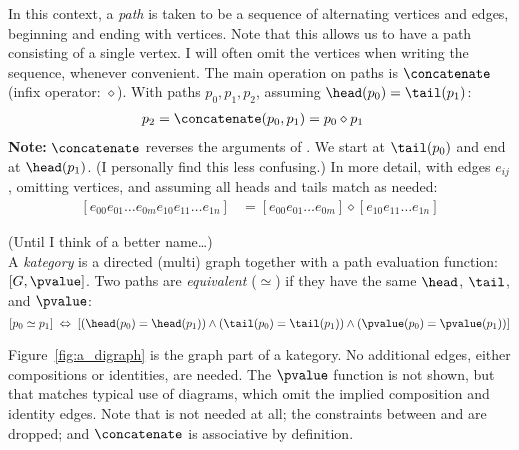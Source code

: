 \documentclass[11pt]{book}
\begin{document}
\begin{definition}[Paths]
In this context, a \textit{path} is taken to be a sequence of
alternating vertices and edges, beginning and ending 
with vertices. 
Note that this allows us to have a path consisting 
of a single vertex.
I will often omit the vertices when writing the sequence,
whenever convenient.
The main operation on paths is $\concatenate$
(infix operator: $\diamond$).
With paths $p_0,p_1,p_2$,
assuming $\head(p_0) = \tail(p_1)$: 
\begin{align*}
p_2 & = \concatenate(p_0,p_1) = p_0 \diamond p_1
\end{align*}
\textbf{Note:} $\concatenate$ reverses the arguments
of \compose. 
We start at $\tail(p_0)$ and end at 
$\head(p_1)$.
(I personally find this less confusing.)
In more detail, with edges $e_{ij}$,
omitting vertices, 
and assuming all heads and tails match as needed:
\begin{align*}
\left[ e_{00} e_{01} \ldots e_{0m}
e_{10} e_{11} \ldots e_{1n}
 \right]
& = 
\left[ e_{00} e_{01} \ldots e_{0m} \right]
\diamond
\left[ e_{10} e_{11} \ldots e_{1n} \right]
\end{align*}
\end{definition}

\begin{definition}
(Until I think of a better name\ldots)\\
A \textit{kategory} is a directed (multi) graph together with
a path evaluation function: $\left[G, \pvalue\right]$.
Two paths are \textit{equivalent} ($\simeq$) 
if they have the same 
$\head$, $\tail$, and $\pvalue$:
\[
\left[ p_0 \simeq p_1 \right]
\;  \Leftrightarrow \;
\left[
\left( \head(p_0) = \head(p_1) \right)
\wedge
\left( \tail(p_0) = \tail(p_1) \right)
\wedge
\left( \pvalue(p_0) = \pvalue(p_1) \right)
\right]
\]
\end{definition}

Figure~\ref{fig:a_digraph} is the graph part of a kategory.
No additional edges, either compositions or identities, are
needed. 
The $\pvalue$  function is not shown,
but that matches typical
use of diagrams, which omit the implied
composition and identity edges.
Note that \identity is not needed at all;
the constraints between \identity and \compose
are dropped; and $\concatenate$ is associative by definition.

\label{sec:Kategory_from_category}
\end{document}
